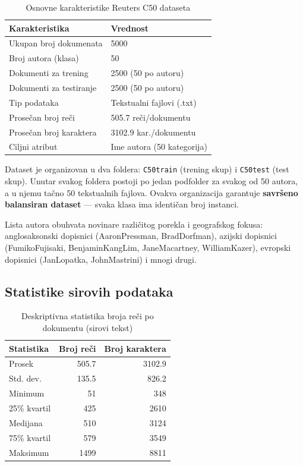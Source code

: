 \documentclass[12pt, a4paper]{article}
\begin{document}
\begin{table}[H]
\centering
\caption{Osnovne karakteristike Reuters C50 dataseta}
\begin{tabular}{ll}
\toprule
\textbf{Karakteristika}     & \textbf{Vrednost} \\
\midrule
Ukupan broj dokumenata      & 5000 \\
Broj autora (klasa)         & 50 \\
Dokumenti za trening        & 2500 (50 po autoru) \\
Dokumenti za testiranje     & 2500 (50 po autoru) \\
Tip podataka                & Tekstualni fajlovi (.txt) \\
Prosečan broj reči          & 505.7 reči/dokumentu \\
Prosečan broj karaktera     & 3102.9 kar./dokumentu \\
Ciljni atribut              & Ime autora (50 kategorija) \\
\bottomrule
\end{tabular}
\end{table}

Dataset je organizovan u dva foldera: \texttt{C50train} (trening skup) i \texttt{C50test}
(test skup). Unutar svakog foldera postoji po jedan podfolder za svakog od 50 autora,
a u njemu tačno 50 tekstualnih fajlova. Ovakva organizacija garantuje \textbf{savršeno
balansiran dataset} — svaka klasa ima identičan broj instanci.

Lista autora obuhvata novinare različitog porekla i geografskog fokusa:
anglosaksonski dopisnici (AaronPressman, BradDorfman), azijski dopisnici
(FumikoFujisaki, BenjaminKangLim, JaneMacartney, WilliamKazer),
evropski dopisnici (JanLopatka, JohnMastrini) i mnogi drugi.

\subsection{Statistike sirovih podataka}

\begin{table}[H]
\centering
\caption{Deskriptivna statistika broja reči po dokumentu (sirovi tekst)}
\begin{tabular}{lrr}
\toprule
\textbf{Statistika} & \textbf{Broj reči} & \textbf{Broj karaktera} \\
\midrule
Prosek     & 505.7   & 3102.9 \\
Std. dev.  & 135.5   & 826.2  \\
Minimum    & 51      & 348    \\
25\% kvartil & 425  & 2610   \\
Medijana   & 510     & 3124   \\
75\% kvartil & 579  & 3549   \\
Maksimum   & 1499    & 8811   \\
\bottomrule
\end{tabular}
\end{table}
\end{document}
